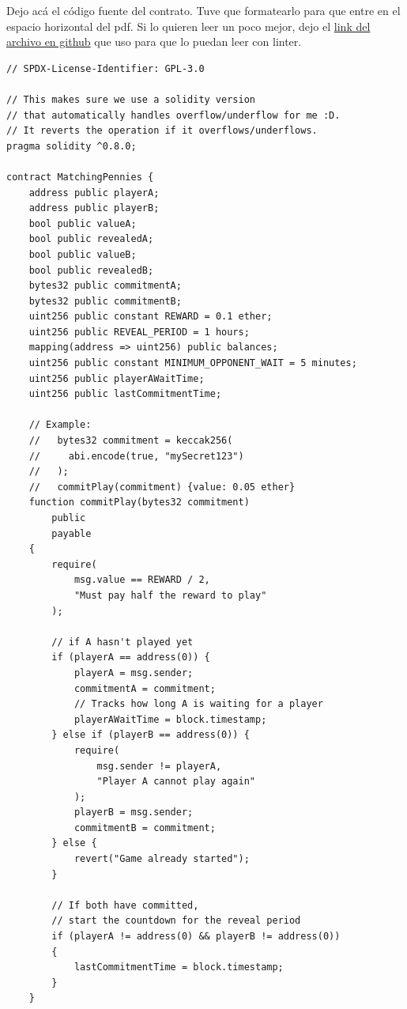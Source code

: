\documentclass[12pt,addpoints,answers]{exam}
\begin{document}
\begin{questions}
\begin{parts}
\begin{solution} %
  Dejo acá el código fuente del contrato. 
  Tuve que formatearlo para que entre en el espacio horizontal del pdf.
  Si lo quieren leer un poco mejor, dejo el \href{https://github.com/pedrofuentes79/Fundamentos-y-Aplicaciones-de-Blockchain/blob/main/src/HW2_MatchingPennies.sol}{link del archivo en github} que uso para que lo puedan leer con linter.

  \begin{verbatim}
// SPDX-License-Identifier: GPL-3.0

// This makes sure we use a solidity version 
// that automatically handles overflow/underflow for me :D. 
// It reverts the operation if it overflows/underflows.
pragma solidity ^0.8.0;

contract MatchingPennies {
    address public playerA;
    address public playerB;
    bool public valueA;
    bool public revealedA;
    bool public valueB;
    bool public revealedB;
    bytes32 public commitmentA;
    bytes32 public commitmentB;
    uint256 public constant REWARD = 0.1 ether;
    uint256 public REVEAL_PERIOD = 1 hours;
    mapping(address => uint256) public balances;
    uint256 public constant MINIMUM_OPPONENT_WAIT = 5 minutes;
    uint256 public playerAWaitTime;
    uint256 public lastCommitmentTime;

    // Example:
    //   bytes32 commitment = keccak256(
    //     abi.encode(true, "mySecret123")
    //   );
    //   commitPlay(commitment) {value: 0.05 ether}
    function commitPlay(bytes32 commitment)
        public
        payable
    {
        require(
            msg.value == REWARD / 2,
            "Must pay half the reward to play"
        );

        // if A hasn't played yet
        if (playerA == address(0)) {
            playerA = msg.sender;
            commitmentA = commitment;
            // Tracks how long A is waiting for a player
            playerAWaitTime = block.timestamp;
        } else if (playerB == address(0)) {
            require(
                msg.sender != playerA,
                "Player A cannot play again"
            );
            playerB = msg.sender;
            commitmentB = commitment;
        } else {
            revert("Game already started");
        }

        // If both have committed, 
        // start the countdown for the reveal period
        if (playerA != address(0) && playerB != address(0))
        {
            lastCommitmentTime = block.timestamp;
        }
    }


\end{verbatim}
\end{solution}
\end{parts}
\end{questions}
\end{document}
